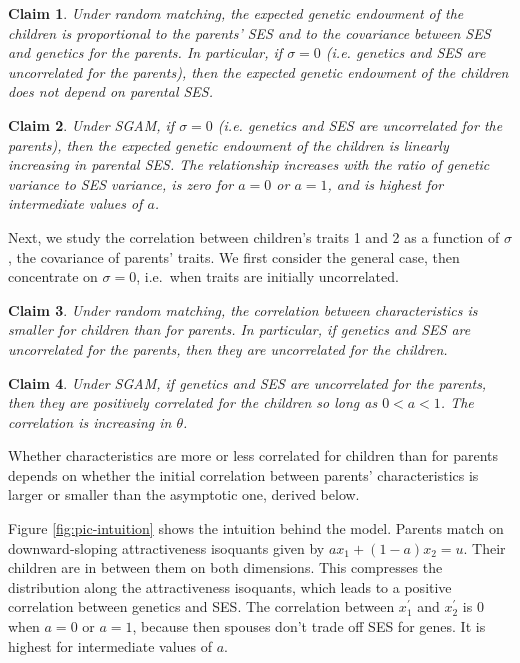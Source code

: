 \documentclass[
]{article}
\newtheorem{claim}{Claim}
\theoremstyle{definition}
\theoremstyle{definition}
\theoremstyle{definition}
\theoremstyle{definition}
\theoremstyle{remark}
\begin{document}
\begin{claim}\label{claim-E-children-RM}
Under random matching, the expected genetic endowment of the children is
proportional to the parents' SES and to the covariance between SES and genetics
for the parents. In particular, if $\sigma = 0$ (i.e. genetics and SES are
uncorrelated for the parents), then the expected genetic endowment of the
children does not depend on parental SES.
\end{claim}

\begin{claim}\label{claim-E-children-SGAM}
Under SGAM, if $\sigma = 0$ (i.e. genetics and
SES are uncorrelated for the parents), then the expected genetic endowment of
the children is linearly increasing in parental SES. The relationship
increases with the ratio of genetic variance to SES variance, is zero for 
$a = 0$ or $a = 1$, and is highest for intermediate values of $a$.
\end{claim}

Next, we study the correlation between children's traits 1 and 2 as a function
of \(\sigma\), the covariance of parents' traits. We first consider the
general case, then concentrate on \(\sigma = 0\), i.e.~when traits are initially
uncorrelated.

\begin{claim}\label{claim-corr-children-RM}
Under random matching, the correlation between characteristics is smaller
for children than for parents. In particular, if genetics and SES are
uncorrelated for the parents, then they are uncorrelated for the children.
\end{claim}

\begin{claim}\label{claim-corr-children-SGAM}
Under SGAM, if genetics and SES are uncorrelated for the parents, then they
are positively correlated for the children so long as $0 < a < 1$. The 
correlation is increasing in $\theta$.
\end{claim}

Whether characteristics are more or less correlated for children than for
parents depends on whether the initial correlation between parents'
characteristics is larger or smaller than the asymptotic one, derived below.

Figure \ref{fig:pic-intuition} shows the intuition behind the model. Parents
match on downward-sloping attractiveness isoquants given by \(a x_1 + (1-a) x_2 = u\).
Their children are in between them on both dimensions. This compresses the
distribution along the attractiveness isoquants, which leads to a
positive correlation between genetics and SES. The correlation between \(x^\prime_1\)
and \(x^\prime_2\) is 0 when \(a = 0\) or \(a = 1\), because then spouses don't trade off
SES for genes. It is highest for intermediate values of \(a\).
\end{document}
